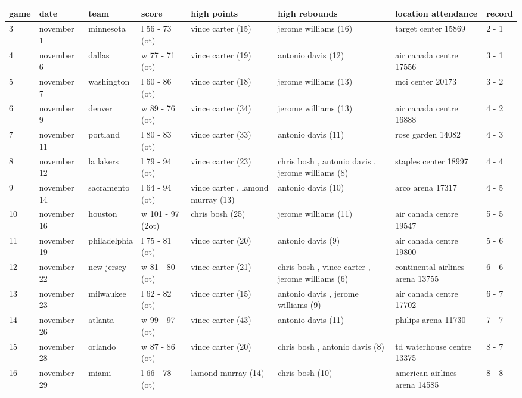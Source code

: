 \documentclass{article}
\begin{document}
\begin{tabular}{llllllll}
\toprule
game & date & team & score & high points & high rebounds & location attendance & record \\
\midrule
3 & november 1 & minnesota & l 56 - 73 (ot) & vince carter (15) & jerome williams (16) & target center 15869 & 2 - 1 \\
4 & november 6 & dallas & w 77 - 71 (ot) & vince carter (19) & antonio davis (12) & air canada centre 17556 & 3 - 1 \\
5 & november 7 & washington & l 60 - 86 (ot) & vince carter (18) & jerome williams (13) & mci center 20173 & 3 - 2 \\
6 & november 9 & denver & w 89 - 76 (ot) & vince carter (34) & jerome williams (13) & air canada centre 16888 & 4 - 2 \\
7 & november 11 & portland & l 80 - 83 (ot) & vince carter (33) & antonio davis (11) & rose garden 14082 & 4 - 3 \\
8 & november 12 & la lakers & l 79 - 94 (ot) & vince carter (23) & chris bosh , antonio davis , jerome williams (8) & staples center 18997 & 4 - 4 \\
9 & november 14 & sacramento & l 64 - 94 (ot) & vince carter , lamond murray (13) & antonio davis (10) & arco arena 17317 & 4 - 5 \\
10 & november 16 & houston & w 101 - 97 (2ot) & chris bosh (25) & jerome williams (11) & air canada centre 19547 & 5 - 5 \\
11 & november 19 & philadelphia & l 75 - 81 (ot) & vince carter (20) & antonio davis (9) & air canada centre 19800 & 5 - 6 \\
12 & november 22 & new jersey & w 81 - 80 (ot) & vince carter (21) & chris bosh , vince carter , jerome williams (6) & continental airlines arena 13755 & 6 - 6 \\
13 & november 23 & milwaukee & l 62 - 82 (ot) & vince carter (15) & antonio davis , jerome williams (9) & air canada centre 17702 & 6 - 7 \\
14 & november 26 & atlanta & w 99 - 97 (ot) & vince carter (43) & antonio davis (11) & philips arena 11730 & 7 - 7 \\
15 & november 28 & orlando & w 87 - 86 (ot) & vince carter (20) & chris bosh , antonio davis (8) & td waterhouse centre 13375 & 8 - 7 \\
16 & november 29 & miami & l 66 - 78 (ot) & lamond murray (14) & chris bosh (10) & american airlines arena 14585 & 8 - 8 \\
\bottomrule
\end{tabular}
\end{document}
